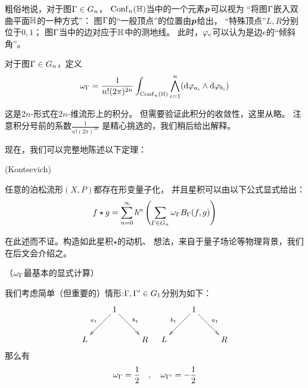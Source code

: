 粗俗地说，对于图$\Gamma\in G_n$，
$\operatorname{Conf}_n(\mathbb{H})$当中的一个元素$\boldsymbol{p}$可以视为
“将图$\Gamma$嵌入双曲平面$\mathbb{H}$的一种方式”：
图$\Gamma$的“一般顶点”的位置由$\boldsymbol{p}$给出，
“特殊顶点”$L,R$分别位于$0,1$；
图$\Gamma$当中的边对应于$\mathbb{H}$中的测地线。
此时，$\varphi_e$可以认为是边$e$的“倾斜角”。

\begin{definition}
对于图$\Gamma\in G_n$，定义
$$
  \omega_{\Gamma}=\frac{1}{n!(2\pi)^{2n}}
  \int_{\operatorname{Conf}_n(\mathbb{H})}
    \bigwedge_{i=1}^n(\mathrm{d}\varphi_{a_i}\wedge\mathrm{d}\varphi_{b_i})
$$
\end{definition}
这是$2n$-形式在$2n$-维流形上的积分。
但需要验证此积分的收敛性，这里从略。
注意积分号前的系数$\frac{1}{n!(2\pi)^{2n}}$
是精心挑选的，我们稍后给出解释。

现在，我们可以完整地陈述以下定理：
\begin{thm}(Kontsevich)

任意的泊松流形$(X,P)$都存在形变量子化，
并且星积可以由以下公式显式给出：%
$$
  f\star g
=
  \sum_{n=0}^{\infty}
    \hbar^n
    \left(
      \sum_{\Gamma\in G_n}
        \omega_{\Gamma}
        B_\Gamma(f,g)
    \right)
$$
\end{thm}
在此述而不证。构造如此星积$\star$的动机、
想法，来自于量子场论等物理背景，我们在后文会介绍之。

\begin{example}（$\omega_{\Gamma}$最基本的显式计算）

我们考虑简单（但重要的）情形:$\Gamma,\Gamma'\in G_1$分别为如下：
$$
  \xymatrix{
    &1\ar[dl]_{a_1}  \ar[dr]^{b_1}
    &
  \\
     L
    &
    &R
  }
\quad
   \xymatrix{
    &1\ar[dl]_{b_1}  \ar[dr]^{a_1}
    &
  \\
     L
    &
    &R
  }
$$
那么有
$$\omega_\Gamma=\frac{1}{2}\quad,\quad \omega_{\Gamma'}=-\frac{1}{2}$$
\end{example}

